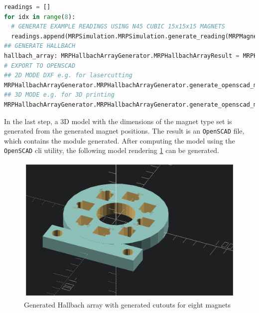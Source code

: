 \begin{lstlisting}[language=Python, caption={MRPHallbachArrayGenerator example for generating an OpenSCAD based hallbach ring}, label=lst:mrpexample_hallbach]
readings = []
for idx in range(8):
  # GENERATE EXAMPLE READINGS USING N45 CUBIC 15x15x15 MAGNETS
  readings.append(MRPSimulation.MRPSimulation.generate_reading(MRPMagnetTypes.MagnetType.N45_CUBIC_15x15x15))
## GENERATE HALLBACH
hallbach_array: MRPHallbachArrayGenerator.MRPHallbachArrayResult = MRPHallbachArrayGenerator.MRPHallbachArrayGenerator.generate_1k_hallbach_using_polarisation_direction(readings)
# EXPORT TO OPENSCAD
## 2D MODE DXF e.g. for lasercutting
MRPHallbachArrayGenerator.MRPHallbachArrayGenerator.generate_openscad_model([hallbach_array], "./2d_test.scad",_2d_object_code=True)
## 3D MODE e.g. for 3D printing
MRPHallbachArrayGenerator.MRPHallbachArrayGenerator.generate_openscad_model([hallbach_array], "./3d_test.scad",_2d_object_code=False)
\end{lstlisting}

In the last step, a 3D model with the dimensions of the magnet type set
is generated from the generated magnet positions. The result is an
\passthrough{\lstinline!OpenSCAD!} \cite{OpenSCAD} file, which
contains the module generated. After computing the model using the
\passthrough{\lstinline!OpenSCAD!} \gls{cli} utility, the following
model rendering
\ref{Generated_Hallbach_array_with_generated_cutouts_for_eight_magnets.png}
can be generated.

\begin{figure}
\centering
\includegraphics{./generated_images/border_Generated_Hallbach_array_with_generated_cutouts_for_eight_magnets.png}
\caption{Generated Hallbach array with generated cutouts for eight
magnets
\label{Generated_Hallbach_array_with_generated_cutouts_for_eight_magnets.png}}
\end{figure}

